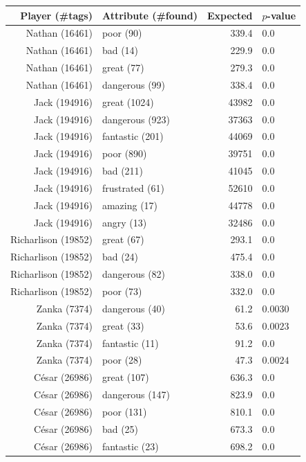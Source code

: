 \documentclass[10pt, a4paper]{UUThesisTemplate}
\begin{document}
\begin{table}
\hspace{-0.8cm}
\begin{minipage}[t]{8cm}
\scriptsize\vspace{0pt}
\begin{tabular}{r l r l}
Player (\#tags) & Attribute (\#found) & Expected & $p$-value\\\hline
Nathan (16461) & poor (90) & 339.4 & $0.0$\\
Nathan (16461) & bad (14) & 229.9 & $0.0$\\
Nathan (16461) & great (77) & 279.3 & $0.0$\\
Nathan (16461) & dangerous (99) & 338.4 & $0.0$\\
Jack (194916) & great (1024) & 43982 & $0.0$\\
Jack (194916) & dangerous (923) & 37363 & $0.0$\\
Jack (194916) & fantastic (201) & 44069 & $0.0$\\
Jack (194916) & poor (890) & 39751 & $0.0$\\
Jack (194916) & bad (211) & 41045 & $0.0$\\
Jack (194916) & frustrated (61) & 52610 & $0.0$\\
Jack (194916) & amazing (17) & 44778 & $0.0$\\
Jack (194916) & angry (13) & 32486 & $0.0$\\
Richarlison (19852) & great (67) & 293.1 & $0.0$\\
Richarlison (19852) & bad (24) & 475.4 & $0.0$\\
Richarlison (19852) & dangerous (82) & 338.0 & $0.0$\\
Richarlison (19852) & poor (73) & 332.0 & $0.0$\\
Zanka (7374) & dangerous (40) & 61.2 & $0.0030$\\
Zanka (7374) & great (33) & 53.6 & $0.0023$\\
Zanka (7374) & fantastic (11) & 91.2 & $0.0$\\
Zanka (7374) & poor (28) & 47.3 & $0.0024$\\
César (26986) & great (107) & 636.3 & $0.0$\\
César (26986) & dangerous (147) & 823.9 & $0.0$\\
César (26986) & poor (131) & 810.1 & $0.0$\\
César (26986) & bad (25) & 673.3 & $0.0$\\
César (26986) & fantastic (23) & 698.2 & $0.0$\\

\end{tabular}
\end{minipage}
\end{table}
\end{document}
